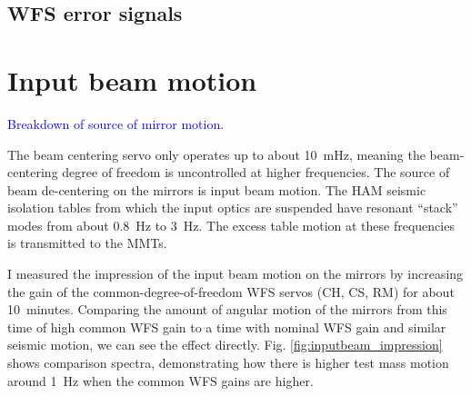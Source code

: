 \subsection{WFS error signals}



\section{Input beam motion}
\textcolor{blue}{Breakdown of source of mirror motion.}

The beam centering servo only operates up to about 10~mHz, meaning the
beam-centering degree of freedom is uncontrolled at higher
frequencies. The source of beam de-centering on the mirrors is input
beam motion. The HAM seismic isolation tables from which the input
optics are suspended have resonant ``stack'' modes from about 0.8~Hz
to 3~Hz. The excess table motion at these frequencies is transmitted
to the MMTs. 

I measured the impression of the input beam motion on the mirrors by
increasing the gain of the common-degree-of-freedom WFS servos (CH,
CS, RM) for about 10~minutes. Comparing the amount of angular
motion of the mirrors from this time of high common WFS gain to a time
with nominal WFS gain and similar seismic motion, we can see the
effect directly. Fig. \ref{fig:inputbeam_impression} shows comparison
spectra, demonstrating how there is higher test mass motion around
1~Hz when the common WFS gains are higher.

